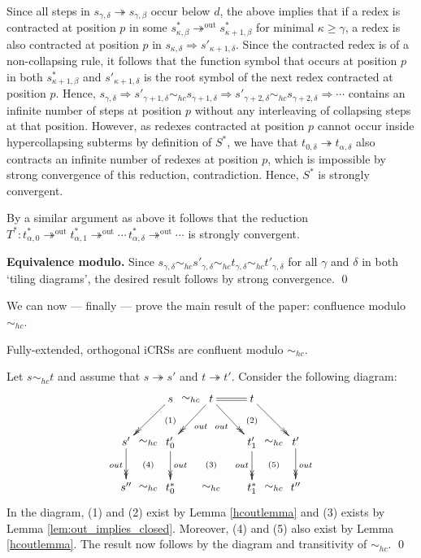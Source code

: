 \documentclass{LMCS}
\theoremstyle{plain}
\theoremstyle{definition}
\newcommand{\trewt}{\twoheadrightarrow}
\newcommand{\out}{\trewt^\mathrm{out}}
\newcommand{\simhc}{\sim_{hc}}
\newcommand{\dev}{\Rightarrow}
\begin{document}
Since all steps in $s_{\gamma, \delta} \trewt s_{\gamma, \beta}$ occur below $d$, the above implies that if a redex is contracted at position $p$ in some $s^*_{\kappa, \beta} \out s^*_{\kappa + 1, \beta}$ for minimal $\kappa \geq \gamma$, a redex is also contracted at position $p$ in $s_{\kappa, \delta} \dev s'_{\kappa + 1, \delta}$. Since the contracted redex is of a non-collapsing rule, it follows that the function symbol that occurs at position $p$ in both $s^*_{\kappa + 1, \beta}$ and $s'_{\kappa + 1, \delta}$ is the root symbol of the next redex contracted at position $p$. Hence, $s_{\gamma, \delta} \dev s'_{\gamma + 1, \delta} \simhc s_{\gamma + 1, \delta} \dev s'_{\gamma + 2, \delta} \simhc s_{\gamma + 2, \delta} \dev \cdots$ contains an infinite number of steps at position $p$ without any interleaving of collapsing steps at that position. However, as redexes contracted at position $p$ cannot occur inside hypercollapsing subterms by definition of $S^*$, we have that $t_{0, \delta} \trewt t_{\alpha, \delta}$ also contracts an infinite number of redexes at position $p$, which is impossible by strong convergence of this reduction, contradiction. Hence, $S^*$ is strongly convergent.

By a similar argument as above it follows that the reduction $T^* : t^*_{\alpha, 0} \out t^*_{\alpha, 1} \out \cdots \, t^*_{\alpha, \delta} \out \cdots$ is strongly convergent.

{\bf Equivalence modulo.}
Since $s_{\gamma, \delta} \simhc s'_{\gamma, \delta} \simhc t_{\gamma, \delta} \simhc t'_{\gamma, \delta}$ for all $\gamma$ and $\delta$ in both `tiling diagrams', the desired result follows by strong convergence. \qed





We can now --- finally --- prove the main result of the paper:
confluence modulo $\simhc$.

\begin{thm}
\label{the:confl_modulo}
Fully-extended, orthogonal iCRSs are confluent modulo $\simhc$.
\end{thm}

\proof
Let $s \simhc t$ and assume that $s \trewt s'$ and $t \trewt t'$. Consider the following diagram:
\[
\xymatrix{
    & s \ar@{}[r]|*\txt{$\simhc$} \ar@{->>}[dl] \ar@{}[d]|{\mathrm{(1)}}
    & t \ar@{=}[r] \ar@{->>}[dl]^{out} \ar@{->>}[dr]_{out}
    & t \ar@{->>}[dr] \ar@{}[d]|{\mathrm{(2)}} \\
s' \ar@{}[r]|*\txt{$\simhc$} \ar@{->>}[d]_{out} \ar@{}[dr]|{\mathrm{(4)}}
    & t'_0 \ar@{->>}[d]^{out} \ar@{}[drr]|{\mathrm{(3)}}
    & 
    & t'_1 \ar@{}[r]|*\txt{$\simhc$} \ar@{->>}[d]_{out}
    & t' \ar@{->>}[d]^{out} \ar@{}[dl]|{\mathrm{(5)}} \\
s'' \ar@{}[r]|*\txt{$\simhc$}
    & t^*_0 \ar@{}[rr]|*\txt{$\simhc$}
    &
    & t^*_1 \ar@{}[r]|*\txt{$\simhc$}
    & t''
}
\]
In the diagram, (1) and (2) exist by Lemma \ref{hcoutlemma} and (3) exists by Lemma \ref{lem:out_implies_closed}. Moreover, (4) and (5) also exist by Lemma \ref{hcoutlemma}. The result now follows by the diagram and transitivity of $\simhc$. \qed
\end{document}

